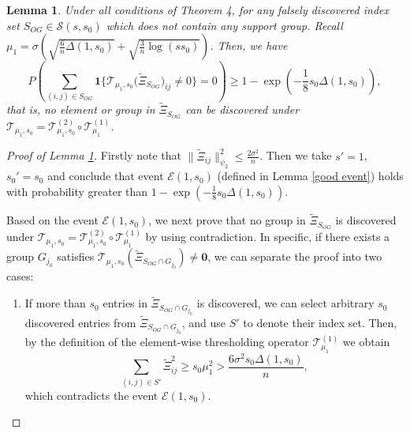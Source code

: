 \documentclass[12pt]{article}
\newtheorem{lemma}{Lemma}
\newtheorem{proof}{Proof}
\begin{document}
\begin{appendix}
\begin{lemma}\label{exactOGChi2:1st}
    Under all conditions of Theorem 4, for any falsely discovered index set $S_{OG} \in \mathcal S(s,s_0)$ which does not contain any support group. 
    Recall $\mu_1 = \sigma \left( \sqrt{ \frac{6}{n} \Delta(1,s_0) } + \sqrt{ \frac{3}{n} \log(ss_0) } \right)$.
    Then, we have
    \begin{equation*} 
    P \left( \sum_{(i,j) \in S_{OG}} \mathbf1\Big\{\mathcal T_{\mu_{1},s_0} \big(\tilde \Xi_{S_{OG}}\big)_{ij} \ne 0 \Big\} = 0 \right) \ge 1- \exp\left( -\frac18 s_0 \Delta(1,s_0) \right),
    \end{equation*}
    that is, no element or group in $\tilde \Xi_{S_{OG}}$ can be discovered under $ \mathcal T_{\mu_{1},s_0} = \mathcal T_{\mu_{1},s_0}^{(2)} \circ \mathcal T_{\mu_{1}}^{(1)}$.
\end{lemma}

\begin{proof}[Proof of Lemma \ref{exactOGChi2:1st}]
    Firstly note that $\| \tilde \Xi_{ij} \|_{\psi_2}^2 \le \frac{2\sigma^2}{n} $.
    Then we take $s' = 1$, $s_0'=s_0$ and conclude that event $\mathcal E(1,s_0)$ (defined in Lemma \ref{good event}) holds with probability greater than $1- \exp\left(-\frac18 s_0 \Delta(1,s_0) \right)$.
    
    Based on the event $\mathcal E(1,s_0)$, we next prove that no group in $\tilde \Xi_{S_{OG}}$ is discovered under $ \mathcal T_{\mu_{1},s_0} = \mathcal T_{\mu_{1},s_0}^{(2)} \circ \mathcal T_{\mu_{1}}^{(1)}$ by using contradiction. 
    In specific, if there exists a group $G_{j_0}$ satisfies $\mathcal T_{\mu_1,s_0}(\tilde \Xi_{S_{OG}\cap G_{j_0}}) \ne \mathbf 0$, we can separate the proof into two cases:
    \begin{enumerate}
        \item If more than $s_0$ entries in $\tilde \Xi_{S_{OG}\cap G_{j_0}}$ is discovered, we can select arbitrary $s_0$ discovered entries from $\tilde \Xi_{S_{OG}\cap G_{j_0}}$, and use $S'$ to denote their index set.
        Then, by the definition of the element-wise thresholding operator $\mathcal T_{\mu_{1}}^{(1)}$ we obtain
        \begin{equation*} 
        \sum_{(i,j) \in S'} \tilde \Xi_{ij}^2  
        \ge  s_0 \mu_1^2 
        >\frac{6\sigma^2 s_0 \Delta(1,s_0)}{n},
        \end{equation*}
        which contradicts the event $\mathcal E(1,s_0)$.


\end{enumerate}
\end{proof}
\end{appendix}
\end{document}
